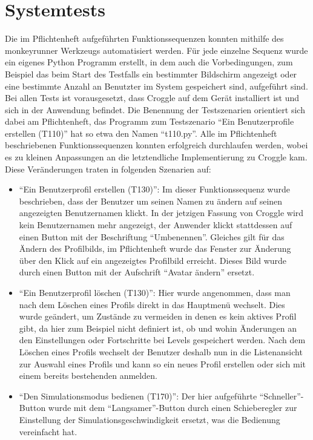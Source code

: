 \chapter{Systemtests}

Die im Pflichtenheft aufgeführten Funktionssequenzen konnten mithilfe des monkeyrunner Werkzeugs automatisiert werden. Für jede einzelne Sequenz wurde ein eigenes Python Programm erstellt, in dem auch die Vorbedingungen, zum Beispiel das beim Start des Testfalls ein bestimmter Bildschirm angezeigt oder eine bestimmte Anzahl an Benutzter im System gespeichert sind, aufgeführt sind. Bei allen Tests ist vorausgesetzt, dass Croggle auf dem Gerät installiert ist und sich in der Anwendung befindet. Die Benennung der Testszenarien orientiert sich dabei am Pflichtenheft, das Programm zum Testszenario "`Ein Benutzerprofile erstellen (T110)"' hat so etwa den Namen "`t110.py"'. Alle im Pflichtenheft beschriebenen Funktionssequenzen konnten erfolgreich durchlaufen werden, wobei es zu kleinen Anpassungen an die letztendliche Implementierung zu Croggle kam. Diese Veränderungen traten in folgenden Szenarien auf:  

\begin{itemize}
   \item "`Ein Benutzerprofil erstellen (T130)"': Im dieser Funktionssequenz wurde beschrieben, dass der Benutzer um seinen Namen zu ändern auf seinen angezeigten Benutzernamen klickt. In der jetzigen Fassung von Croggle wird kein Benutzernamen mehr angezeigt, der Anwender klickt stattdessen auf einen Button mit der Beschriftung "`Umbenennen"'. Gleiches gilt für das Ändern des Profilbilds, im Pflichtenheft wurde das Fenster zur Änderung über den Klick auf ein angezeigtes Profilbild erreicht. Dieses Bild wurde durch einen Button mit der Aufschrift "`Avatar ändern"' ersetzt. 
  
   \item "`Ein Benutzerprofil löschen (T130)"': Hier wurde angenommen, dass man nach dem Löschen eines Profils direkt in das Hauptmenü wechselt. Dies wurde geändert, um Zustände zu vermeiden in denen es kein aktives Profil gibt, da hier zum Beispiel nicht definiert ist, ob und wohin Änderungen an den Einstellungen oder Fortschritte bei Levels gespeichert werden. Nach dem Löschen eines Profils wechselt der Benutzer deshalb nun in die Listenansicht zur Auswahl eines Profils und kann so ein neues Profil erstellen oder sich mit einem bereits bestehenden anmelden.
   
    \item "`Den Simulationsmodus bedienen (T170)"': Der hier aufgeführte "`Schneller"'-Button wurde mit dem "`Langsamer"'-Button durch einen Schieberegler zur Einstellung der Simulationsgeschwindigkeit ersetzt, was die Bedienung vereinfacht hat.
   
   
\end{itemize}

